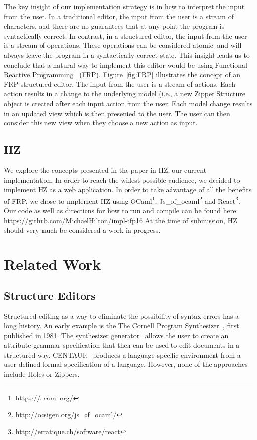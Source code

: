 \documentclass{llncs}
\begin{document}
The key insight of our implementation strategy is in how to interpret the input from the user.
In a traditional editor, the input from the user is a stream of characters, and there are no guarantees that at any point the program is syntactically correct.
In contrast, in a structured editor, the input from the user is a stream of operations.  These operations can be considered atomic, and will always leave the program in a syntactically correct state.
This insight leads us to conclude that a natural way to implement this editor would be using Functional Reactive Programming~\cite{Wan:2000:FRP:349299.349331} (FRP).
Figure~\ref{fig:FRP} illustrates the concept of an FRP structured editor.
The input from the user is a stream of actions.  Each action results in a change to the underlying model (i.e., a new Zipper Structure object is created after each input action from the user.
Each model change results in an updated view which is then presented to the user.  The user can then consider this new view when they choose a new action as input.

\subsection{HZ}
We explore the concepts presented in the paper in HZ, our current implementation.
In order to reach the widest possible audience, we decided to implement HZ as a web application.
In order to take advantage of all the benefits of FRP, we chose to implement HZ using OCaml\footnote{https://ocaml.org/}, Js\_of\_ocaml\footnote{http://ocsigen.org/js\_of\_ocaml/} and React\footnote{http://erratique.ch/software/react}.
Our code as well as directions for how to run and compile can be found here: \url{https://github.com/MichaelHilton/impl-tfp16}
At the time of submission, HZ should very much be considered a work in progress.

\section{Related Work}\label{sec:rw}
\subsection{Structure Editors}

Structured editing as a way to eliminate the possibility of syntax errors has a long history.  An early example is the
The Cornell Program Synthesizer~\cite{teitelbaum_cornell_1981}, first published in 1981.
The synthesizer generator~\cite{Reps:1984:SG:390010.808247} allows the user to create an attribute-grammar specification that then can be used to edit documents in a structured way.
CENTAUR~\cite{Borras:1988:CS:64140.65005} produces a language specific environment from a user defined formal specification of a language.  However, none of the approaches include Holes or Zippers.
\end{document}
